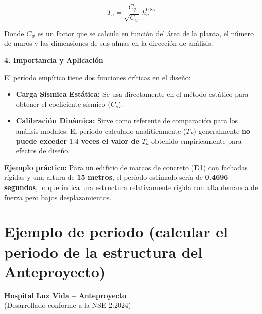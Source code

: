 \documentclass[14pt,letterpaper]{extarticle}
\begin{document}
\[
T_a = \frac{C_q}{\sqrt{C_w}} \, h_n^{0.85}
\]

Donde \textbf{$C_w$} es un factor que se calcula en función del área de la planta, el número de muros y las dimensiones de sus almas en la dirección de análisis.

\textbf{4. Importancia y Aplicación}

El período empírico tiene dos funciones críticas en el diseño:

\begin{itemize}
	\item \textbf{Carga Sísmica Estática:} Se usa directamente en el método estático para obtener el coeficiente sísmico ($C_s$).
	\item \textbf{Calibración Dinámica:} Sirve como referente de comparación para los análisis modales. El período calculado analíticamente ($T_F$) generalmente \textbf{no puede exceder $1.4$ veces el valor de $T_a$} obtenido empíricamente para efectos de diseño.
\end{itemize}

\textbf{Ejemplo práctico:} Para un edificio de marcos de concreto (\textbf{E1}) con fachadas rígidas y una altura de \textbf{15 metros}, el período estimado sería de \textbf{0.4696 segundos}, lo que indica una estructura relativamente rígida con alta demanda de fuerza pero bajos desplazamientos.










	


			
	\newpage
	
	\section{Ejemplo de periodo (calcular el periodo de la estructura del Anteproyecto)}
	
	\begin{center}
		\textbf{Hospital Luz Vida – Anteproyecto} \\[0.2cm]
		(Desarrollado conforme a la NSE-2:2024)
	\end{center}
	
\end{document}
